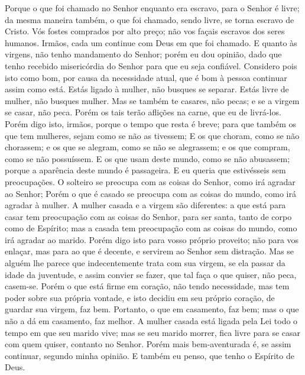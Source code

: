 {Porque o que foi chamado no Senhor enquanto era escravo, para o Senhor é livre; da mesma maneira também, o que foi chamado, sendo livre, se torna escravo de Cristo.
Vós fostes comprados por alto preço;
{} não vos façais escravos dos seres humanos.
Irmãos, cada um continue com Deus
{} em que foi chamado.
E quanto às virgens, não tenho mandamento do Senhor; porém eu dou
{} opinião, dado que tenho recebido misericórdia do Senhor para que eu seja confiável.
Considero pois isto como bom, por causa da necessidade atual, que é bom à pessoa continuar assim como está.
Estás ligado à mulher, não busques se separar. Estás livre de mulher, não busques mulher.
Mas se também te casares, não pecas; e se a virgem se casar, não peca. Porém os tais terão aflições na carne, que eu
{} de livrá-los.
Porém digo isto, irmãos, porque o tempo que resta é breve; para que também os que tem mulheres, sejam como se não as tivessem;
E os que choram, como se não chorassem; e os que se alegram, como se não se alegrassem; e os que compram, como se não possuíssem.
E os que usam
{} deste mundo, como se
{} não abusassem; porque a aparência deste mundo é passageira.
E eu queria que estivésseis sem preocupações. O solteiro se preocupa com as coisas do Senhor, como irá agradar ao Senhor;
Porém o que é casado se preocupa com as coisas do mundo, como irá agradar à mulher.
A mulher casada e a virgem são diferentes: a que está para casar tem preocupação com as coisas do Senhor, para ser santa, tanto de corpo como de Espírito; mas a casada tem preocupação com as coisas do mundo, como irá agradar ao marido.
Porém digo isto para vosso próprio proveito; não para vos enlaçar, mas para
{} ao que é decente, e servirem ao Senhor sem distração.
Mas se alguém lhe parece que indecentemente trata com sua virgem, se ela passar da idade da juventude, e assim convier se fazer, que tal faça o que quiser, não peca, casem-se.
Porém o que está firme em
{} coração, não tendo necessidade, mas tem poder sobre sua própria vontade, e isto decidiu em seu próprio coração, de guardar sua virgem, faz bem.
Portanto, o que
{} em casamento, faz bem; mas o que não a dá em casamento, faz melhor.
A mulher casada está ligada pela Lei todo o tempo em que seu marido vive; mas se seu marido morrer, fica livre para se casar com quem quiser, contanto
{} no Senhor.
Porém mais bem-aventurada é, se assim continuar, segundo minha opinião. E também eu penso, que tenho o Espírito de Deus.

}
